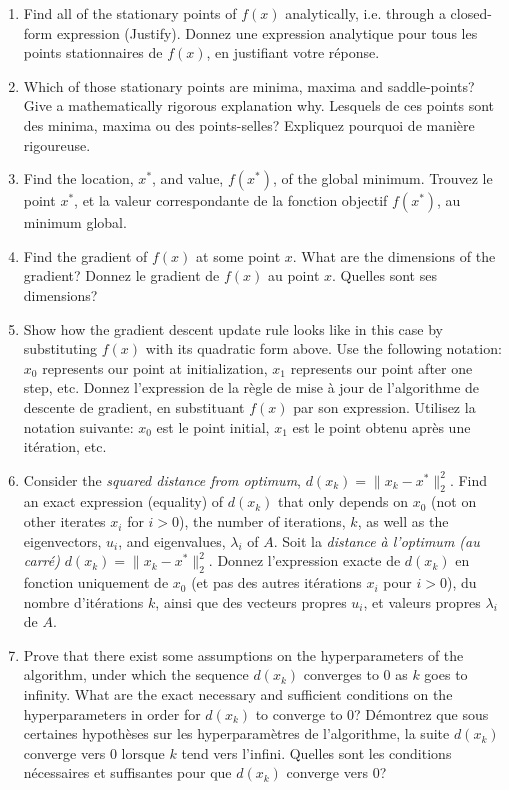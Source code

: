 \documentclass[11pt,french,english]{article}
\newcommand{\french}[1]{ {\color{blue} #1} }
\begin{document}
\begin{enumerate}
\begin{enumerate}
    \item Find all of the stationary points of $f(x)$ analytically, i.e. through a closed-form expression (Justify). \french{Donnez une expression analytique pour tous les points stationnaires de $f(x)$, en justifiant votre réponse.}
    \item Which of those stationary points are minima, maxima and saddle-points?
    Give a mathematically rigorous explanation why. \french{Lesquels de ces points sont des minima, maxima ou des points-selles? Expliquez pourquoi de manière rigoureuse.}
    \item Find the location, $x^*$, and value, $f(x^*)$, of the global minimum. \french{Trouvez le point $x^*$, et la valeur correspondante de la fonction objectif $f(x^*)$, au minimum global.}
    \item Find the gradient of $f(x)$ at some point $x$.  
    What are the dimensions of the gradient? \french{Donnez le gradient de $f(x)$ au point $x$. Quelles sont ses dimensions?}
    \item Show how the gradient descent update rule looks like in this case by substituting $f(x)$ with its quadratic form above.
    Use the following notation: 
    $x_0$ represents our point at initialization, $x_1$ represents our point after one step, etc. \french{Donnez l'expression de la règle de mise à jour de l'algorithme de descente de gradient, en substituant $f(x)$ par son expression.
    Utilisez la notation suivante: 
    $x_0$ est le point initial, $x_1$ est le point obtenu après une itération, etc.}
    \item Consider the {\em squared distance from optimum}, $d(x_k) = \|x_k - x^*\|_2^2$.
    Find an exact expression (equality) of $d(x_k)$ that only depends on $x_0$ (not on other iterates $x_i$ for $i>0$), the number of iterations, $k$, as well as the eigenvectors, $u_i$, and eigenvalues, $\lambda_i$ of $A$. \french{Soit la {\em distance à l'optimum (au carré)} $d(x_k) = \|x_k - x^*\|_2^2$. Donnez l'expression exacte de $d(x_k)$ en fonction uniquement de $x_0$ (et pas des autres itérations $x_i$ pour $i>0$), du nombre d'itérations $k$, ainsi que des vecteurs propres $u_i$, et valeurs propres $\lambda_i$ de $A$.}
    \item  \iftoggle{undergrad}{{\color{red} [bonus]}}{}  Prove that there exist some assumptions on the hyperparameters of the algorithm, under which
    the sequence $d(x_k)$ converges to $0$ as $k$ goes to infinity.
    What are the exact necessary and sufficient conditions on the hyperparameters in order for $d(x_k)$ to converge to 0? \french{Démontrez que sous certaines hypothèses sur les hyperparamètres de l'algorithme, la suite $d(x_k)$ converge vers $0$ lorsque $k$ tend vers l'infini. Quelles sont les conditions nécessaires et suffisantes pour que $d(x_k)$ converge vers $0$?}

\end{enumerate}
\end{enumerate}
\end{document}
